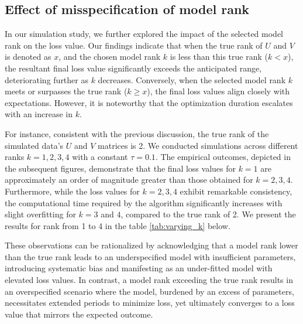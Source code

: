 \documentclass{article}
\begin{document}
\subsection{Effect of misspecification of model rank}
In our simulation study, we further explored the impact of the selected model rank on the loss value. Our findings indicate that when the true rank of $U$ and $V$ is denoted as $x$, and the chosen model rank $k$ is less than this true rank ($k < x$), the resultant final loss value significantly exceeds the anticipated range, deteriorating further as $k$ decreases. Conversely, when the selected model rank $k$ meets or surpasses the true rank ($k \geq x$), the final loss values align closely with expectations. However, it is noteworthy that the optimization duration escalates with an increase in $k$.

For instance, consistent with the previous discussion, the true rank of the simulated data's $U$ and $V$ matrices is 2. We conducted simulations across different ranks $k = 1, 2, 3, 4$ with a constant $\tau = 0.1$. The empirical outcomes, depicted in the subsequent figures, demonstrate that the final loss values for $k = 1$ are approximately an order of magnitude greater than those obtained for $k = 2, 3, 4$. Furthermore, while the loss values for $k = 2, 3, 4$ exhibit remarkable consistency, the computational time required by the algorithm significantly increases with slight overfitting for $k = 3$ and $4$, compared to the true rank of 2. We present the results for rank from 1 to 4 in the table \ref{tab:varying_k} below.

These observations can be rationalized by acknowledging that a model rank lower than the true rank leads to an underspecified model with insufficient parameters, introducing systematic bias and manifesting as an under-fitted model with elevated loss values. In contrast, a model rank exceeding the true rank results in an overspecified scenario where the model, burdened by an excess of parameters, necessitates extended periods to minimize loss, yet ultimately converges to a loss value that mirrors the expected outcome.
\end{document}
